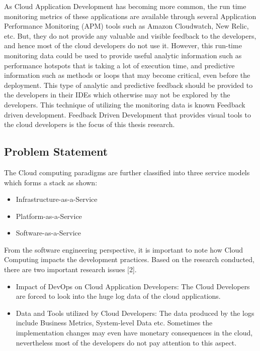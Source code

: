 \documentclass[article,type=msc,colorback,accentcolor=tud7b]{tudthesis}
\begin{document}
	\par As Cloud Application Development has becoming more common, the run time monitoring metrics of these applications are available through several Application Performance Monitoring (APM) tools such as Amazon Cloudwatch, New Relic, etc. But, they do not provide any valuable and visible feedback to the developers, and hence most of the cloud developers do not use it. However, this run-time monitoring data could be used to provide useful analytic information such as performance hotspots that is taking a lot of execution time, and predictive information such as methods or loops that may become critical, even before the deployment. This type of analytic and predictive feedback should be provided to the developers in their IDEs which otherwise may not be explored by the developers. This technique of utilizing the monitoring data is known Feedback driven development. Feedback Driven Development that provides visual tools to the cloud developers is the focus of this thesis research.	
	
	\subsection{Problem Statement}	
	
The Cloud computing paradigms are further classified into three service models which forms a stack as shown: 
\begin{itemize}
	
	\item Infrastructure-as-a-Service
	
	\item Platform-as-a-Service
	
	\item Software-as-a-Service  
\end{itemize}
	
From the software engineering perspective, it is important to note how Cloud Computing impacts the development practices. Based on the research conducted, there are two important research issues [2]. 

\begin{itemize}

	
	\item Impact of DevOps on Cloud Application Developers:	
	The Cloud Developers are forced to look into the huge log data of the cloud applications.
	
	\item Data and Tools utilized by Cloud Developers:
	The data produced by the logs include Business Metrics, System-level Data etc. Sometimes the implementation changes may even have monetary consequences in the cloud, nevertheless most of the developers do not pay attention to this aspect.  
	
	
	
\end{itemize}
 
\end{document}
